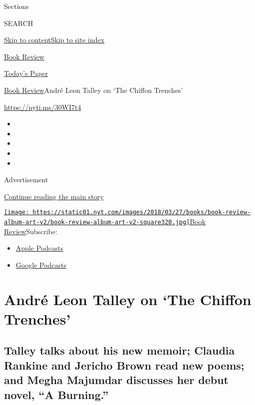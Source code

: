 Sections

SEARCH

\protect\hyperlink{site-content}{Skip to
content}\protect\hyperlink{site-index}{Skip to site index}

\href{https://www.nytimes.com/section/books/review}{Book Review}

\href{https://myaccount.nytimes.com/auth/login?response_type=cookie\&client_id=vi}{}

\href{https://www.nytimes.com/section/todayspaper}{Today's Paper}

\href{/section/books/review}{Book Review}\textbar{}André Leon Talley on
`The Chiffon Trenches'

\url{https://nyti.ms/30WI7t4}

\begin{itemize}
\item
\item
\item
\item
\item
\end{itemize}

Advertisement

\protect\hyperlink{after-top}{Continue reading the main story}

\href{https://www.nytimes.com/column/book-review-podcast}{\texttt{[image: https://static01.nyt.com/images/2018/03/27/books/book-review-album-art-v2/book-review-album-art-v2-square320.jpg]}Book
Review}Subscribe:

\begin{itemize}
\tightlist
\item
  \href{https://itunes.apple.com/us/podcast/id120315179}{Apple Podcasts}
\item
  \href{https://www.google.com/podcasts?feed=aHR0cHM6Ly9yc3MuYXJ0MTkuY29tL2Jvb2stcmV2aWV3}{Google
  Podcasts}
\end{itemize}

\hypertarget{andruxe9-leon-talley-on-the-chiffon-trenches}{%
\section{André Leon Talley on `The Chiffon
Trenches'}\label{andruxe9-leon-talley-on-the-chiffon-trenches}}

\hypertarget{talley-talks-about-his-new-memoir-claudia-rankine-and-jericho-brown-read-new-poems-and-megha-majumdar-discusses-her-debut-novel-a-burning}{%
\subsection{Talley talks about his new memoir; Claudia Rankine and
Jericho Brown read new poems; and Megha Majumdar discusses her debut
novel, ``A
Burning.''}\label{talley-talks-about-his-new-memoir-claudia-rankine-and-jericho-brown-read-new-poems-and-megha-majumdar-discusses-her-debut-novel-a-burning}}

